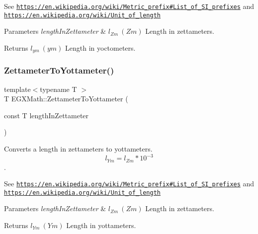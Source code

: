 See \href{https://en.wikipedia.org/wiki/Metric_prefix#List_of_SI_prefixes}{\tt https\+://en.\+wikipedia.\+org/wiki/\+Metric\+\_\+prefix\#\+List\+\_\+of\+\_\+\+S\+I\+\_\+prefixes} and \href{https://en.wikipedia.org/wiki/Unit_of_length}{\tt https\+://en.\+wikipedia.\+org/wiki/\+Unit\+\_\+of\+\_\+length} 
\begin{DoxyParams}{Parameters}
{\em length\+In\+Zettameter} & $ l_{Zm}\ (Zm)$ Length in zettameters. \\
\hline
\end{DoxyParams}
\begin{DoxyReturn}{Returns}
$ l_{ym}\ (ym)$ Length in yoctometers. 
\end{DoxyReturn}
\mbox{\label{group___e_g_x_math-_conversions-_length_conversions-_zettameter-_s_i_ga50b4ccf902ce36f4519ce580bf2234d4}} 
\subsubsection{\texorpdfstring{Zettameter\+To\+Yottameter()}{ZettameterToYottameter()}}
{\footnotesize\ttfamily template$<$typename T $>$ \\
T E\+G\+X\+Math\+::\+Zettameter\+To\+Yottameter (\begin{DoxyParamCaption}\item[{const T}]{length\+In\+Zettameter }\end{DoxyParamCaption})}



Converts a length in zettameters to yottameters. \[ l_{Ym}=l_{Zm} * 10^{-3} \]. 

See \href{https://en.wikipedia.org/wiki/Metric_prefix#List_of_SI_prefixes}{\tt https\+://en.\+wikipedia.\+org/wiki/\+Metric\+\_\+prefix\#\+List\+\_\+of\+\_\+\+S\+I\+\_\+prefixes} and \href{https://en.wikipedia.org/wiki/Unit_of_length}{\tt https\+://en.\+wikipedia.\+org/wiki/\+Unit\+\_\+of\+\_\+length} 
\begin{DoxyParams}{Parameters}
{\em length\+In\+Zettameter} & $ l_{Zm}\ (Zm)$ Length in zettameters. \\
\hline
\end{DoxyParams}
\begin{DoxyReturn}{Returns}
$ l_{Ym}\ (Ym)$ Length in yottameters. 
\end{DoxyReturn}
\mbox{\label{group___e_g_x_math-_conversions-_length_conversions-_zettameter-_s_i_gab9f9d7e92a7aaf47b4b822163cd700c7}} 
